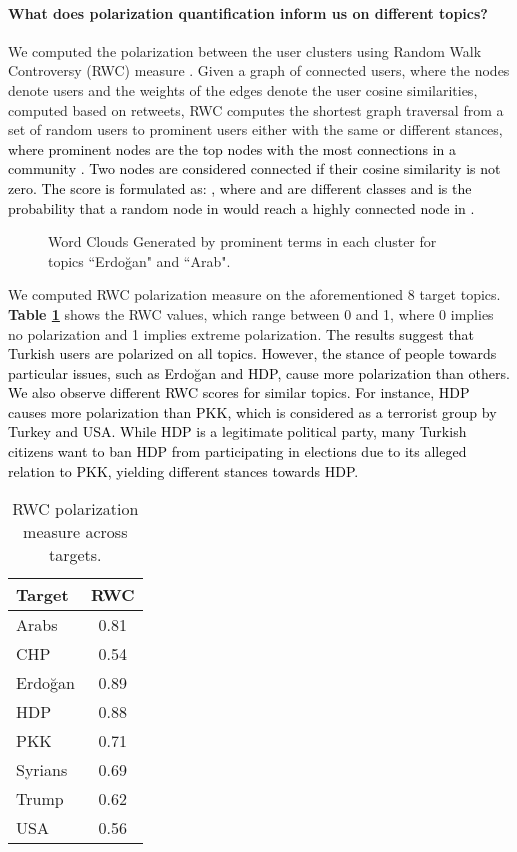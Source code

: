 \documentclass[letterpaper]{article} \usepackage{aaai20}  \usepackage{times}  \usepackage{stackengine}
\newcommand{\kareem}{\textcolor{black}}
\newcommand{\mucahid}{\textcolor{black}}
\begin{document}
\paragraph{What does polarization quantification inform us on different topics?}
We computed the polarization between the user clusters using Random Walk Controversy (RWC) measure \citep{darwish2019quantifying,garimella2018quantifying}. Given a graph of connected users, where the nodes denote users and the weights of the edges denote the user cosine similarities, computed based on retweets, RWC computes the shortest graph traversal from a set of random users to prominent users either with the same or different stances, \kareem{where prominent nodes are the top  nodes with the most connections in a community \citep{darwish2019quantifying}. Two nodes are considered connected if their cosine similarity is not zero. The score is formulated as: , where  and  are different classes and  is the probability that a random node in  would reach a highly connected node in .}

\begin{figure*}[!htb]
\centering
{}\hfill
{}\hfill
{}\hfill
{}
    \caption{Word Clouds Generated by prominent terms in each cluster for topics ``Erdo\u{g}an" and ``Arab".}
    \label{fig:WordClouds}
\end{figure*}
We computed RWC polarization measure on the aforementioned 8 target topics. \textbf{Table \ref{tab:RWCRes}} shows the RWC values, which range between 0 and 1, where 0 implies no polarization and 1 implies extreme polarization. \mucahid{The results suggest that Turkish users are polarized on all topics. However, the stance of people towards particular issues, such as Erdo\u{g}an and HDP, cause more polarization than others. We also observe different RWC scores for similar topics. For instance, HDP causes more polarization than PKK, which is considered as a terrorist group by Turkey and USA. While HDP is a legitimate political party, many Turkish citizens want to ban HDP from participating in elections due to its alleged relation to PKK, yielding different stances towards HDP.}  
\begin{table}[!htb]
    \centering
    \begin{tabular}{l|c}
Target	&	RWC	\\ \hline
Arabs	&	0.81	\\
CHP	&	0.54	\\
Erdo\u{g}an & 0.89 \\
HDP	&	0.88	\\
PKK	&	0.71	\\
Syrians	&	0.69	\\
Trump	&	0.62	\\
USA	&	0.56	\\
    \end{tabular}
    \caption{RWC polarization measure across targets.}
    \label{tab:RWCRes}
\end{table}
\vspace{-6pt}
\end{document}
